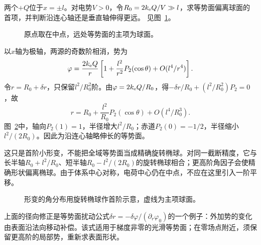 \begin{example}[两同号电荷的远处等势面]\label{ex:es2-e5}
两个$+Q$位于$x=\pm l$。对电势$V>0$，令$R_0=2k_{\rm e} Q/V\gg l$，求等势面偏离球面的首项，并判断沿连心轴还是垂直轴伸得更远。 见图~\ref{fig:es2-e5-q}。
\end{example}

\begin{figure}[H]\centering
{}
\caption{原点取在中点，远处等势面的主项为球面。}\label{fig:es2-e5-q}
\end{figure}
\begin{solution}
以$x$轴为极轴，两源的奇数阶相消，势为
\[\varphi=\frac{2k_{\rm e} Q}{r}\left[1+\frac{l^2}{r^2}P_2(\cos\theta)+O(l^4/r^4)\right].\]
令$r=R_0+\delta r$，只保留$l^2/R_0^2$阶。由$\varphi=2k_{\rm e} Q/R_0$，得$-\delta r/R_0+(l^2/R_0^2)P_2=0$，故
\[\boxed{r=R_0+\frac{l^2}{R_0}P_2(\cos\theta)+O(l^4/R_0^3)}.
\]
图~\ref{fig:es2-e5-s}中，轴向$P_2(1)=1$，半径增大$l^2/R_0$；赤道$P_2(0)=-1/2$，半径缩小$l^2/(2R_0)$。因此为沿连心轴略伸长的等势面。

这只是首阶小形变，不能把全域等势面当成精确旋转椭球。对同一截断精度，它与长半轴$R_0+l^2/R_0$、短半轴$R_0-l^2/(2R_0)$的旋转椭球相合；更高阶角因子会使精确形状偏离椭球。由于体系中心对称，电荷中心仍在中点，不应在这里引入一阶平移。
\begin{figure}[H]\centering
{}
\caption{形变的角分布用旋转椭球作首阶示意，虚线为主项球面。}\label{fig:es2-e5-s}
\end{figure}


上面的径向修正是等势面扰动公式$\delta r=-\delta\varphi/(\partial_r\varphi_0)$的一个例子：外加势的变化由表面沿法向移动补偿。该式适用于梯度非零的光滑等势面；在零场点附近，须保留更高阶的局部势，重新求表面形状。
\end{solution}

